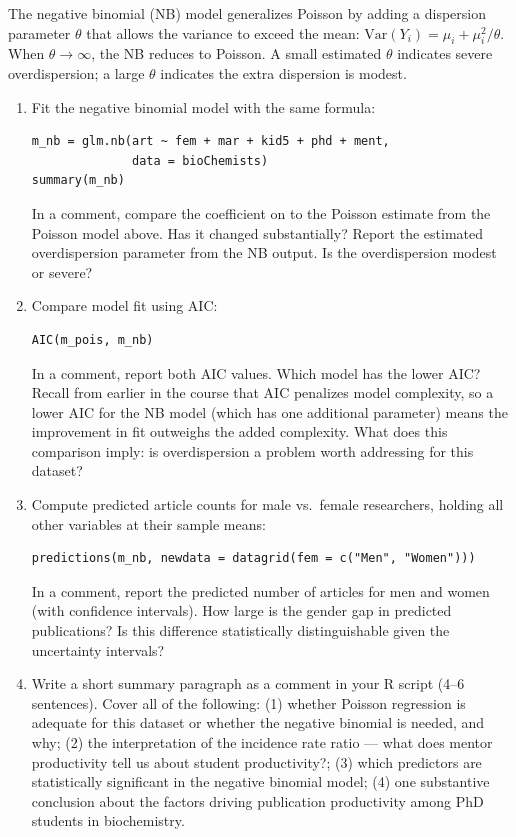 The negative binomial (NB) model generalizes Poisson by adding a dispersion parameter $\theta$ that allows the variance to exceed the mean: $\text{Var}(Y_i) = \mu_i + \mu_i^2 / \theta$. When $\theta \to \infty$, the NB reduces to Poisson. A small estimated $\theta$ indicates severe overdispersion; a large $\theta$ indicates the extra dispersion is modest.

\begin{enumerate}[label=\alph*)]

  \item Fit the negative binomial model with the same formula:
  \begin{lstlisting}
m_nb = glm.nb(art ~ fem + mar + kid5 + phd + ment,
              data = bioChemists)
summary(m_nb)
  \end{lstlisting}
  In a comment, compare the coefficient on  to the Poisson estimate from the Poisson model above. Has it changed substantially? Report the estimated overdispersion parameter  from the NB output. Is the overdispersion modest or severe?

  \item Compare model fit using AIC:
  \begin{lstlisting}
AIC(m_pois, m_nb)
  \end{lstlisting}
  In a comment, report both AIC values. Which model has the lower AIC? Recall from earlier in the course that AIC penalizes model complexity, so a lower AIC for the NB model (which has one additional parameter) means the improvement in fit outweighs the added complexity. What does this comparison imply: is overdispersion a problem worth addressing for this dataset?

  \item Compute predicted article counts for male vs.\ female researchers, holding all other variables at their sample means:
  \begin{lstlisting}
predictions(m_nb, newdata = datagrid(fem = c("Men", "Women")))
  \end{lstlisting}
  In a comment, report the predicted number of articles for men and women (with confidence intervals). How large is the gender gap in predicted publications? Is this difference statistically distinguishable given the uncertainty intervals?

  \item Write a short summary paragraph as a comment in your R script (4--6 sentences). Cover all of the following: (1) whether Poisson regression is adequate for this dataset or whether the negative binomial is needed, and why; (2) the interpretation of the  incidence rate ratio --- what does mentor productivity tell us about student productivity?; (3) which predictors are statistically significant in the negative binomial model; (4) one substantive conclusion about the factors driving publication productivity among PhD students in biochemistry.

\end{enumerate}

